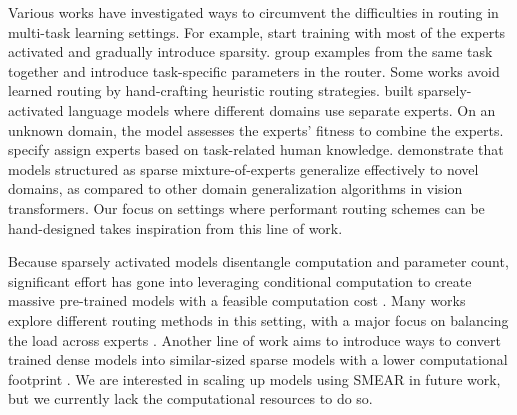 \documentclass{article}
\theoremstyle{plain}
\theoremstyle{definition}
\theoremstyle{remark}
\begin{document}
Various works have investigated ways to circumvent the difficulties in routing in multi-task learning settings.
For example, \citet{deecke2020latent,hazimeh2021dselect,dua2021tricks} start training with most of the experts activated and gradually introduce sparsity. \citet{kudugunta2021beyond, ponti2022combining, ma2019snr, Gupta2022SparselyAM} group examples from the same task together and introduce task-specific parameters in the router.
Some works avoid learned routing by hand-crafting heuristic routing strategies.
\citet{gururangan2021demix} built sparsely-activated language models where different domains use separate experts. On an unknown domain, the model assesses the experts' fitness to combine the experts.
\citet{Tang2022OneMM, Pfeiffer2022LiftingTC, Pfeiffer2020MADXAA} specify assign experts based on task-related human knowledge.
\citet{li2022sparse} demonstrate that models structured as sparse mixture-of-experts generalize effectively to novel domains, as compared to other domain generalization algorithms in vision transformers. 
Our focus on settings where performant routing schemes can be hand-designed takes inspiration from this line of work.

Because sparsely activated models disentangle computation and parameter count, significant effort has gone into leveraging conditional computation to create massive pre-trained models with a feasible computation cost \citep{fedus2022review, shazeer2017outrageously, fedus2021switch,du2022glam,zoph2022designing,yu2022efficient}.
Many works explore different routing methods in this setting, with a major focus on balancing the load across experts \citep{lewis2021base, zhou2022mixture, kool2021unbiased, roller2021hash}.
Another line of work aims to introduce ways to convert trained dense models into similar-sized sparse models with a lower computational footprint \citep{lee2022sparse, zhang2022moefication, komatsuzaki2022sparse}.
We are interested in scaling up models using SMEAR in future work, but we currently lack the computational resources to do so.
\end{document}

